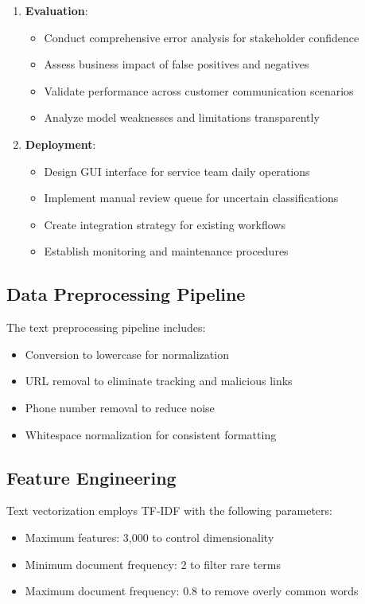 \documentclass[12pt,a4paper]{article}
\begin{document}
\begin{enumerate}
    \item \textbf{Evaluation}: 
    \begin{itemize}
        \item Conduct comprehensive error analysis for stakeholder confidence
        \item Assess business impact of false positives and negatives
        \item Validate performance across customer communication scenarios
        \item Analyze model weaknesses and limitations transparently
    \end{itemize}
    
    \item \textbf{Deployment}: 
    \begin{itemize}
        \item Design GUI interface for service team daily operations
        \item Implement manual review queue for uncertain classifications
        \item Create integration strategy for existing workflows
        \item Establish monitoring and maintenance procedures
    \end{itemize}
\end{enumerate}

\subsection{Data Preprocessing Pipeline}

The text preprocessing pipeline includes:

\begin{itemize}
    \item Conversion to lowercase for normalization
    \item URL removal to eliminate tracking and malicious links
    \item Phone number removal to reduce noise
    \item Whitespace normalization for consistent formatting
\end{itemize}

\subsection{Feature Engineering}

Text vectorization employs TF-IDF with the following parameters:
\begin{itemize}
    \item Maximum features: 3,000 to control dimensionality
    \item Minimum document frequency: 2 to filter rare terms
    \item Maximum document frequency: 0.8 to remove overly common words
\end{itemize}
\end{document}

